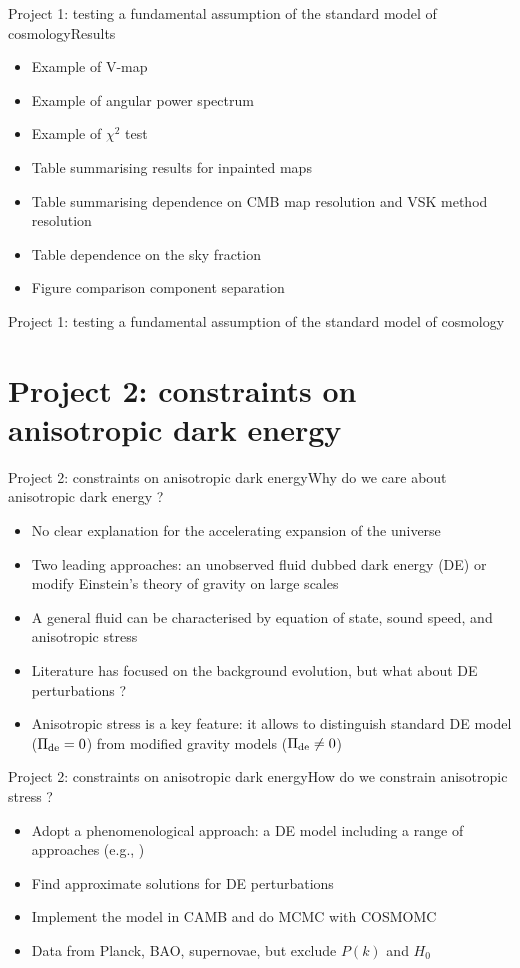 \documentclass{beamer}
\begin{document}
\begin{frame}{Project 1: testing a fundamental assumption of the standard model of cosmology}{Results}
\begin{itemize}
\item Example of V-map
\item Example of angular power spectrum
\item Example of $\chi^2$ test
\item Table summarising results for inpainted maps
\item Table summarising dependence on CMB map resolution and VSK method resolution
\item Table dependence on the sky fraction
\item Figure comparison component separation
\end{itemize}
\end{frame}

\begin{frame}{Project 1: testing a fundamental assumption of the standard model of cosmology}

\end{frame}

\section{Project 2: constraints on anisotropic dark energy}

\begin{frame}{Project 2: constraints on anisotropic dark energy}{Why do we care about anisotropic dark energy ?}
\begin{itemize}
\item No clear explanation for the accelerating expansion of the universe
\item Two leading approaches: an unobserved fluid dubbed dark energy (DE) or modify Einstein's theory of gravity on large scales
\item A general fluid can be characterised by equation of state, sound speed, and anisotropic stress
\item Literature has focused on the background evolution, but what about DE perturbations ?  
\item Anisotropic stress is a key feature: it allows to distinguish standard DE model ($\Pi_{\rm de} = 0$) from modified gravity models ($\Pi_{\rm de}\neq 0$)
\end{itemize}
\end{frame}

\begin{frame}{Project 2: constraints on anisotropic dark energy}{How do we constrain anisotropic stress ?}
\begin{itemize}
\item Adopt a phenomenological approach: a DE model including a range of approaches (e.g., )
\item Find approximate solutions for DE perturbations
\item Implement the model in CAMB and do MCMC with COSMOMC 
\item Data from Planck, BAO, supernovae, but exclude $P(k)$ and $H_0$
\end{itemize}
\end{frame}
\end{document}
